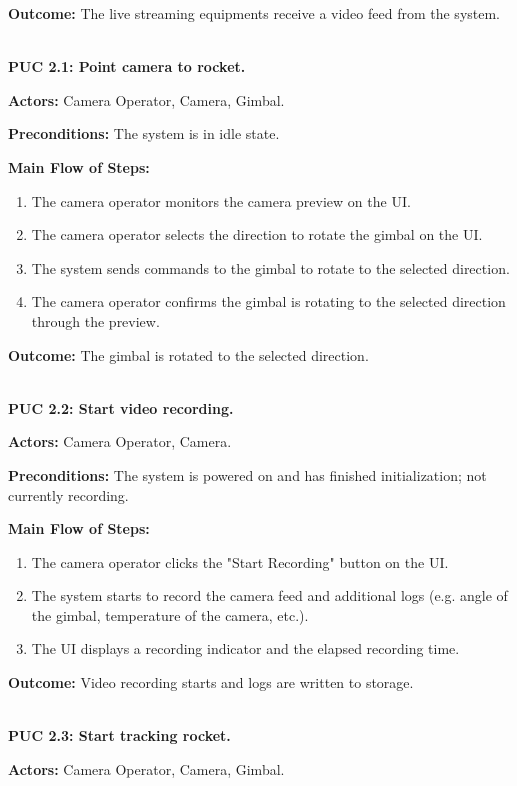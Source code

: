 \documentclass[12pt]{article}
\begin{document}
\textbf{Outcome:} The live streaming equipments receive a video feed from the system.

~\\

\textbf{PUC 2.1: Point camera to rocket.}

\textbf{Actors:} Camera Operator, Camera, Gimbal.

\textbf{Preconditions:} The system is in idle state.

\textbf{Main Flow of Steps:}
\begin{enumerate}
  \item The camera operator monitors the camera preview on the UI.
  \item The camera operator selects the direction to rotate the gimbal on the UI.
  \item The system sends commands to the gimbal to rotate to the selected direction.
  \item The camera operator confirms the gimbal is rotating to the selected direction
        through the preview.
\end{enumerate}

\textbf{Outcome:} The gimbal is rotated to the selected direction.

~\\

\textbf{PUC 2.2: Start video recording.}

\textbf{Actors:} Camera Operator, Camera.

\textbf{Preconditions:} The system is powered on and has finished initialization; not currently recording.

\textbf{Main Flow of Steps:}
\begin{enumerate}
  \item The camera operator clicks the "Start Recording" button on the UI.
  \item The system starts to record the camera feed and additional logs (e.g. angle of
        the gimbal, temperature of the camera, etc.).
  \item The UI displays a recording indicator and the elapsed recording time.
\end{enumerate}

\textbf{Outcome:} Video recording starts and logs are written to storage.

~\\

\textbf{PUC 2.3: Start tracking rocket.}

\textbf{Actors:} Camera Operator, Camera, Gimbal.
\end{document}
